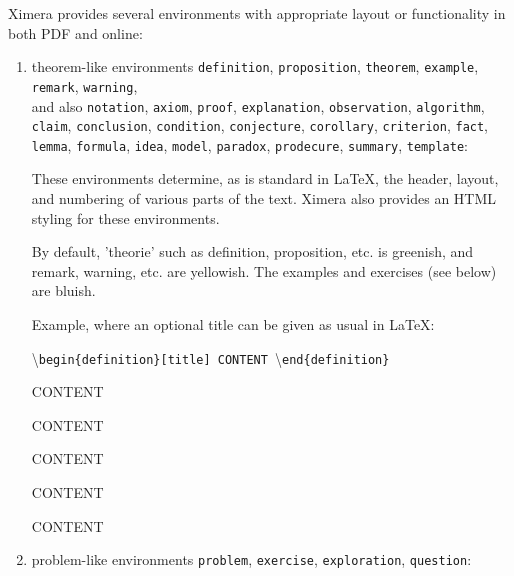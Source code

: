 \documentclass{ximera}
\begin{document}
    \author{Wim Obbels}
    \label{xim:ximeraEnvironments}

Ximera provides several environments with appropriate layout or functionality in both PDF and online:

\begin{enumerate}
    \setlength\itemsep{0em}
    \item theorem-like environments 
    \verb|definition|, \verb|proposition|, \verb|theorem|, 
    \verb|example|, \verb|remark|, \verb|warning|, 
    \\
    and also 
    \verb|notation|, \verb|axiom|, 
    \verb|proof|, \verb|explanation|, 
    \verb|observation|, \verb|algorithm|, \verb|claim|, \verb|conclusion|, \verb|condition|, \verb|conjecture|, \verb|corollary|, \verb|criterion|, \verb|fact|, \verb|lemma|, \verb|formula|, \verb|idea|, \verb|model|, \verb|paradox|, \verb|prodecure|, \verb|summary|, \verb|template|:

    These environments determine, as is standard in \LaTeX, the header, layout, and numbering of various parts of the text. Ximera also provides an HTML styling for these environments.

    By default, 'theorie' such as definition, proposition, etc. is greenish, and remark, warning, etc. are yellowish. The examples and exercises (see below) are bluish.

    Example, where an optional title can be given as usual in \LaTeX:

    \textbackslash \verb|begin{definition}[title] CONTENT |\textbackslash \verb|end{definition}|
    \begin{definition}[title]
        CONTENT
    \end{definition}

    \begin{proposition}[title]
        CONTENT
    \end{proposition}

    \begin{remark}[title]
        CONTENT
    \end{remark}

    \begin{example}[title]
        CONTENT
    \end{example}

    \begin{exercise}[title]
        CONTENT
    \end{exercise}

    \item problem-like environments \verb|problem|, \verb|exercise|, \verb|exploration|, \verb|question|:


\end{enumerate}
\end{document}
